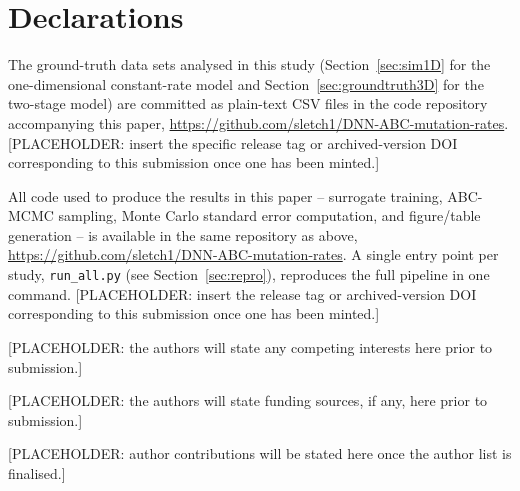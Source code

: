 \documentclass[sn-basic,iicol,pdflatex]{sn-jnl}
\begin{document}
\backmatter

\section*{Declarations}

The ground-truth data sets analysed in this study (Section~\ref{sec:sim1D}
for the one-dimensional constant-rate model and Section~\ref{sec:groundtruth3D}
for the two-stage model) are committed as plain-text CSV files in the code
repository accompanying this paper, \url{https://github.com/sletch1/DNN-ABC-mutation-rates}.
[PLACEHOLDER: insert the specific release tag or archived-version DOI
corresponding to this submission once one has been minted.]

All code used to produce the results in this paper -- surrogate training,
ABC-MCMC sampling, Monte Carlo standard error computation, and figure/table
generation -- is available in the same repository as above,
\url{https://github.com/sletch1/DNN-ABC-mutation-rates}. A single entry
point per study, \texttt{run\_all.py} (see Section~\ref{sec:repro}),
reproduces the full pipeline in one command. [PLACEHOLDER: insert the
release tag or archived-version DOI corresponding to this submission once
one has been minted.]

[PLACEHOLDER: the authors will state any competing interests here prior to
submission.]

[PLACEHOLDER: the authors will state funding sources, if any, here prior to
submission.]

[PLACEHOLDER: author contributions will be stated here once the author list
is finalised.]


\end{document}

